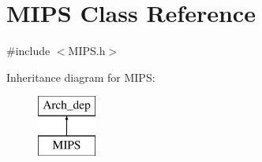 \hypertarget{classMIPS}{}\section{M\+I\+PS Class Reference}
\label{classMIPS}


{\ttfamily \#include $<$M\+I\+P\+S.\+h$>$}

Inheritance diagram for M\+I\+PS\+:\begin{figure}[H]
\begin{center}
\leavevmode
\includegraphics[height=2.000000cm]{classMIPS}
\end{center}
\end{figure}
